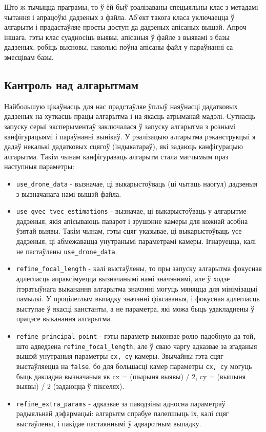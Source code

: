 Што ж тычыцца праграмы, то ў ёй быў рэалізаваны спецыяльны клас з метадамі чытання і апрацоўкі дадзеных з файла. Аб'ект такога класа уключаецца ў алгарытм і прадастаўляе просты доступ да дадзеных апісаных вышэй. Апроч іншага, гэты клас суадносіць выявы, апісаныя ў файле з выявамі з базы дадзеных, робіць высновы, наколькі поўна апісаны файл у параўнанні са змесцівам базы.

\subsection*{Кантроль над алгарытмам}
Найбольшую цікаўнасць для нас прадстаўляе ўплыў наяўнасці дадатковых дадзеных на хуткасць працы алгарытма і на якасць атрыманай мадэлі. Сутнасць запуску серыі эксперыментаў заключалася ў запуску алгарытма з рознымі канфігурацыямі і параўнанні вынікаў. У рэалізацыю алгарытма рэканструкцыі я дадаў некалькі дадатковых сцягоў (індыкатараў), які задаюць канфігурацыю алгарытма. Такім чынам канфігураваць алгарытм стала магчымым праз наступныя параметры:
\begin{itemize}
    \item \verb|use_drone_data| - вызначае, ці выкарыстоўваць (ці чытаць наогул) дадзеныя з вызначанага намі вышэй файла.
    \item \verb|use_qvec_tvec_estimations| - вызначае, ці выкарыстоўваць у алгарытме дадзеныя, якія апісываюць паварот і зрушэнне камеры для кожнай асобна ўзятай выявы. Такім чынам, гэты сцяг указывае, ці выкарыстоўваць усе дадзеныя, ці абмежавацца унутранымі параметрамі камеры. Ігнаруецца, калі не пастаўлены \verb|use_drone_data|.
    \item \verb|refine_focal_length| - калі выстаўлены, то пры запуску алгарытма фокусная адлегласць апраксімуецца вызначанымі намі значэннямі, але ў ходзе ітэратыўнага выканання алгарытма значэнні могуць мяняцца для мінімізацыі памылкі. У процілеглым выпадку значэнні фіксаваныя, і фокусная адлегласць выступае ў якасці канстанты, а не параметра, які можа быць удакладнены ў працэсе выканання алгарытма.
    \item \verb|refine_principal_point| - гэты параметр выконвае ролю падобную да той, што адведзена \verb|refine_focal_length|, але ў сваю чаргу адказвае за згаданыя вышэй унутраныя параметры \verb|cx, cy| камеры. Звычайны гэта сцяг выстаўляецца на \verb|false|, бо для большасці камер параметры \verb|cx, cy| могуць быць дакладна вызначаныя як cx = (шырыня выявы) / 2, cy = (вышыня выявы) / 2 (задаюцца ў пікселях).
    \item \verb|refine_extra_params| - адказвае за паводзіны адносна параметраў радыяльнай дэфармацыі: алгарытм спрабуе палепшыць іх, калі сцяг выстаўлены, і пакідае пастаяннымі ў адваротным выпадку.
\end{itemize}

